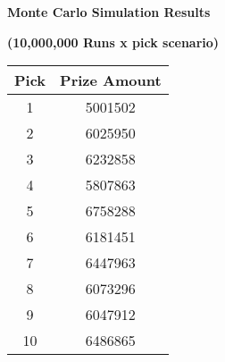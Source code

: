 \documentclass{article}
\begin{document}
\vspace{1cm}
\begin{center}
\textbf{Monte Carlo Simulation Results}
\end{center}
\begin{center}
\textbf{(10,000,000 Runs x pick scenario)}
\end{center}
\begin{center}
\begin{tabular}{cc}
\toprule
Pick & Prize Amount \\
\midrule
1 & 5001502\\
2 & 6025950\\
3 & 6232858\\
4 & 5807863\\
5 & 6758288\\
6 & 6181451\\
7 & 6447963\\
8 & 6073296\\
9 & 6047912\\
10 & 6486865\\
\bottomrule
\end{tabular}
\end{center}
\end{document}
